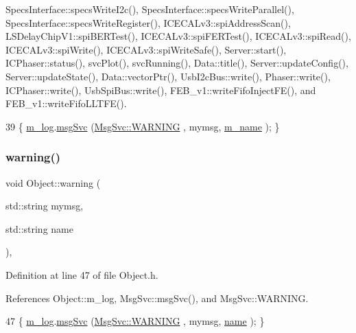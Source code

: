 Specs\+Interface\+::specs\+Write\+I2c(), Specs\+Interface\+::specs\+Write\+Parallel(), Specs\+Interface\+::specs\+Write\+Register(), I\+C\+E\+C\+A\+Lv3\+::spi\+Address\+Scan(), L\+S\+Delay\+Chip\+V1\+::spi\+B\+E\+R\+Test(), I\+C\+E\+C\+A\+Lv3\+::spi\+F\+E\+R\+Test(), I\+C\+E\+C\+A\+Lv3\+::spi\+Read(), I\+C\+E\+C\+A\+Lv3\+::spi\+Write(), I\+C\+E\+C\+A\+Lv3\+::spi\+Write\+Safe(), Server\+::start(), I\+C\+Phaser\+::status(), svc\+Plot(), svc\+Running(), Data\+::title(), Server\+::update\+Config(), Server\+::update\+State(), Data\+::vector\+Ptr(), Usb\+I2c\+Bus\+::write(), Phaser\+::write(), I\+C\+Phaser\+::write(), Usb\+Spi\+Bus\+::write(), F\+E\+B\+\_\+v1\+::write\+Fifo\+Inject\+F\+E(), and F\+E\+B\+\_\+v1\+::write\+Fifo\+L\+L\+T\+F\+E().


\begin{DoxyCode}
39 \{ \hyperlink{classObject_a0d269813dd7ac1f24bc143031e2963f2}{m\_log}.\hyperlink{classMsgSvc_ad25f18047920cc59a314e5098259711c}{msgSvc} (\hyperlink{classMsgSvc_ae671eb7301996cd049d2da8a65925926a7cefae88f2ba26b2b05b676a383c834b}{MsgSvc::WARNING} , mymsg, \hyperlink{classObject_a8b83c95c705d2c3ba0d081fe1710f48d}{m\_name} ); \}
\end{DoxyCode}
\mbox{\label{classObject_a11f101db4dd73d9391b0231818881d86}} 
\subsubsection{\texorpdfstring{warning()}{warning()}\hspace{0.1cm}{\footnotesize\ttfamily [2/2]}}
{\footnotesize\ttfamily void Object\+::warning (\begin{DoxyParamCaption}\item[{std\+::string}]{mymsg,  }\item[{std\+::string}]{name }\end{DoxyParamCaption})\hspace{0.3cm}{\ttfamily [inline]}, {\ttfamily [inherited]}}



Definition at line 47 of file Object.\+h.



References Object\+::m\+\_\+log, Msg\+Svc\+::msg\+Svc(), and Msg\+Svc\+::\+W\+A\+R\+N\+I\+NG.


\begin{DoxyCode}
47 \{ \hyperlink{classObject_a0d269813dd7ac1f24bc143031e2963f2}{m\_log}.\hyperlink{classMsgSvc_ad25f18047920cc59a314e5098259711c}{msgSvc} (\hyperlink{classMsgSvc_ae671eb7301996cd049d2da8a65925926a7cefae88f2ba26b2b05b676a383c834b}{MsgSvc::WARNING} , mymsg, \hyperlink{classObject_a300f4c05dd468c7bb8b3c968868443c1}{name} ); \}
\end{DoxyCode}


